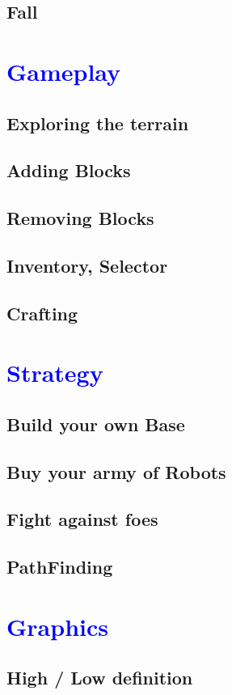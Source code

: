 \documentclass[article]{report}         %
\begin{document}
      \section{Fall}
    \chapter{\textcolor{blue}{Gameplay}}
      \section{Exploring the terrain}
      \section{Adding Blocks}
      \section{Removing Blocks}
      \section{Inventory, Selector}
      \section{Crafting}
    \chapter{\textcolor{blue}{Strategy}}
      \section{Build your own Base}
      \section{Buy your army of Robots}
      \section{Fight against foes}
      \section{PathFinding}
    \chapter{\textcolor{blue}{Graphics}}
      \section{High / Low definition}
\end{document}
